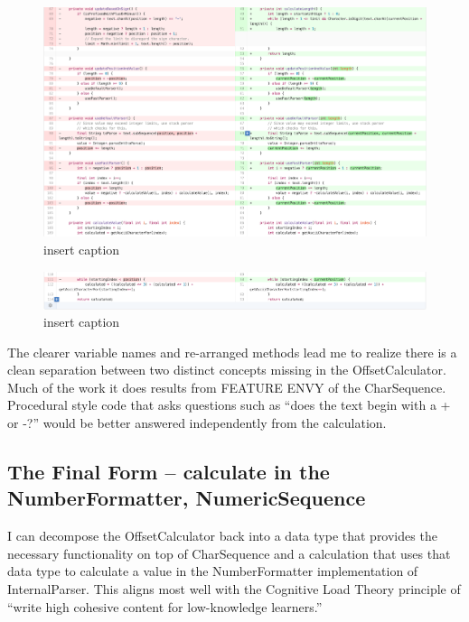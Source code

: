 \begin{figure}[H]
	\centering
	\includegraphics[width=\linewidth]{code128}
	\caption{insert caption}
\end{figure}
\begin{figure}[H]
	\centering
	\includegraphics[width=\linewidth]{code129}
	\caption{insert caption}
\end{figure}

The clearer variable names and re-arranged methods lead me to realize there is a clean separation between two distinct concepts missing in the OffsetCalculator. Much of the work it does results from FEATURE ENVY of the CharSequence. Procedural style code that asks questions such as “does the text begin with a + or -?” would be better answered independently from the calculation.

\subsection{The Final Form -- calculate in the NumberFormatter, NumericSequence}

I can decompose the OffsetCalculator back into a data type that provides the necessary functionality on top of CharSequence and a calculation that uses that data type to calculate a value in the NumberFormatter implementation of InternalParser. This aligns most well with the Cognitive Load Theory principle of “write high cohesive content for low-knowledge learners.”  

